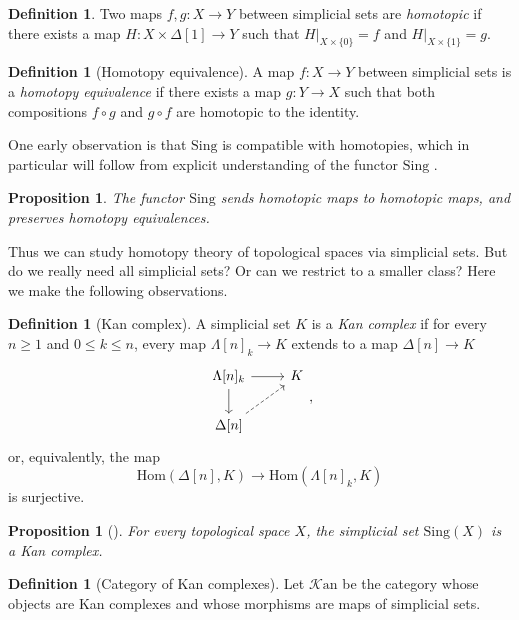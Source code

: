 \documentclass[11pt, a4paper]{amsart}
\newcommand{\Hom}{\mathrm{Hom}}
\newcommand{\Sing}{\mathrm{Sing}}
\newcommand{\Kan}{\mathscr{K}\mathrm{an}}
\newtheorem{proposition}[equation]{Proposition}
\theoremstyle{definition}
\newtheorem{definition}[equation]{Definition}
\theoremstyle{remark}
\numberwithin{equation}{section}
\begin{document}
\begin{definition}
  Two maps $f,g\colon X \to Y$ between simplicial sets are \emph{homotopic} if there exists a map $H\colon X \times \Delta[1] \to Y$ such that $H|_{X \times \{ 0\} } = f$ and $H|_{X \times \{ 1\} } = g$. 
\end{definition}

\begin{definition}[Homotopy equivalence]
  A map $f\colon X \to Y$ between simplicial sets is a \emph{homotopy equivalence} if there exists a map $g\colon Y \to X$ such that both compositions $f \circ g$ and $g \circ f$ are homotopic to the identity.
\end{definition}

One early observation is that $\Sing$ is compatible with homotopies, which in particular will follow from explicit understanding of the functor $\Sing$ \cite[Chapter I]{goerssjardine2009simplicialhomotopytheory}.

\begin{proposition} \label{prop:sing homotopy}
  The functor $\Sing$ sends homotopic maps to homotopic maps, and preserves homotopy equivalences. 
\end{proposition}

Thus we can study homotopy theory of topological spaces via simplicial sets. But do we really need all simplicial sets? Or can we restrict to a smaller class? Here we make the following observations.

\begin{definition}[Kan complex] \label{def:kan complex}
 A simplicial set $K$ is a \emph{Kan complex} if for every $n \geq 1$ and $0 \leq k \leq n$, every map $\Lambda[n]_k \to K$ extends to a map $\Delta[n] \to K$
 \[
 \begin{tikzcd}
    \Lambda[n]_k \arrow[d] \arrow[r] & K \\
    \Delta[n] \arrow[ur, dashed]
   \end{tikzcd},
 \]
 or, equivalently, the map 
 \[\Hom(\Delta[n], K) \to \Hom(\Lambda[n]_k, K) \]
 is surjective.
\end{definition}

\begin{proposition}[{\cite[Proposition 2.3]{goerssjardine2009simplicialhomotopytheory}}] \label{prop:sing kan}
  For every topological space $X$, the simplicial set $\Sing(X)$ is a Kan complex.
\end{proposition}


\begin{definition}[Category of Kan complexes]
  Let $\Kan$ be the category whose objects are Kan complexes and whose morphisms are maps of simplicial sets.
\end{definition}
\end{document}
